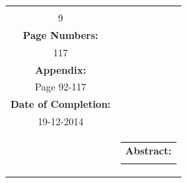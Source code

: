 \begin{titlepage}
\begin{nopagebreak}
{\begin{tabular}{cc}
{\begin{description}
                        \item {\bf Copies:}\\ 9\\
                        \item {\bf Page Numbers:}\\ 117\\
                        \item {\bf Appendix:}\\ Page 92-117\\
                        \item {\bf Date of Completion:}\\ 19-12-2014\\
                    \end{description}
                    \vfill
                } &
                \parbox{7cm}{
                    \vspace{.15cm}
                    \hfill 
                    \begin{tabular}{l}
                        {\bf Abstract:}\bigskip \\
                        \fbox{
                            \parbox{6.5cm}{\smallskip
                                {\vfill{\small 
                                \smallskip}}
                            }
                        }
                    \end{tabular}
                }
            \end{tabular}
        }\\
        \\
    \end{nopagebreak}
\end{titlepage}
